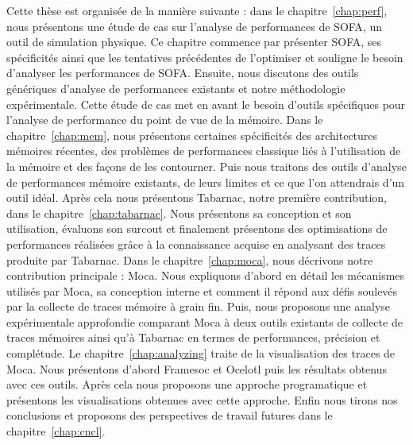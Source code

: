 Cette thèse est organisée de la manière suivante : dans le chapitre~\ref{chap:perf}, nous présentons une étude de cas sur l'analyse de performances de \gls{SOFA}, un outil de simulation physique.
Ce chapitre commence par présenter \gls{SOFA}, ses spécificités ainsi que les tentatives précédentes de l'optimiser et souligne le besoin d'analyser les performances de \gls{SOFA}.
Ensuite, nous discutons des outils génériques d'analyse de performances existants et notre méthodologie expérimentale.
Cette étude de cas met en avant le besoin d'outils spécifiques pour l'analyse de performance du point de vue de la mémoire.
Dans le chapitre~\ref{chap:mem}, nous présentons certaines spécificités des architectures mémoires récentes, des problèmes de performances classique liés à l'utilisation de la mémoire et des façons de les contourner.
Puis nous traitons des outils d'analyse de performances mémoire existants, de leurs limites et ce que l'on attendrais d'un outil idéal.
Après cela nous présentons \gls{Tabarnac}, notre première contribution, dans le chapitre~\ref{chap:tabarnac}.
Nous présentons sa conception et son utilisation, évaluons son surcout et finalement présentons des optimisations de performances réalisées grâce à la connaissance acquise en analysant des traces produite par \gls{Tabarnac}.
Dans le chapitre~\ref{chap:moca}, nous décrivons notre contribution principale : \gls{Moca}.
Nous expliquons d'abord en détail les mécanismes utilisés par \gls{Moca}, sa conception interne et comment il répond aux défis soulevés par la collecte de traces mémoire à grain fin.
Puis, nous proposons une analyse expérimentale approfondie comparant \gls{Moca} à deux outils existants de collecte de traces mémoires ainsi qu'à \gls{Tabarnac} en termes de performances, précision et complétude.
Le chapitre~\ref{chap:analyzing} traite de la visualisation des traces de \gls{Moca}.
Nous présentons d'abord \gls{Framesoc} et \gls{Ocelotl} puis les résultats obtenus avec ces outils.
Après cela nous proposons une approche programatique et présentons les visualisations obtenues avec cette approche.
Enfin nous tirons nos conclusions et proposons des perspectives de travail futures dans le chapitre~\ref{chap:cncl}.

\glsresetall
